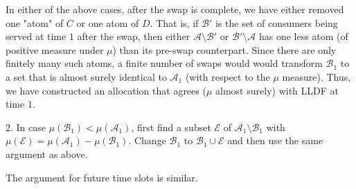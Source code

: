 \documentclass[10pt,draftcls,onecolumn]{IEEEtran}
\newcounter{l1}
\newcounter{l2}
\newcounter{l3}
\begin{document}
In either of the above cases, after the swap is complete, we have either removed one "atom" of $C$ or one atom of $D$.  That is, if $\mathcal{B}'$ is the set of consumers being served at time $1$ after the swap, then either $\mathcal{A}\setminus \mathcal{B}'$ or $\mathcal{B}' \setminus \mathcal{A}$ has one less atom (of positive measure under $\mu$) than its pre-swap counterpart. Since there are only finitely many such atoms, a finite number of swaps would would transform $\mathcal{B}_1$ to a set that is almost surely identical to $\mathcal{A}_1$ (with respect to the $\mu$ measure). Thus, we have constructed an allocation that agrees ($\mu$ almost surely) with LLDF at time $1$. 

2. In case $\mu(\mathcal{B}_1) < \mu(\mathcal{A}_1)$, first find a subset $\mathcal{E}$ of $\mathcal{A}_1 \setminus \mathcal{B}_1$ with $\mu(\mathcal{E}) = \mu(\mathcal{A}_1) - \mu(\mathcal{B}_1)$. Change $\mathcal{B}_1$ to $\mathcal{B}_1 \cup \mathcal{E}$ and then use the same argument as above.

The argument for future time slots is similar.


\end{document}
